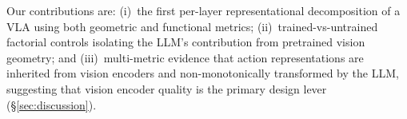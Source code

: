 Our contributions are: (i)~the first per-layer representational decomposition of a VLA using both geometric and functional metrics; (ii)~trained-vs-untrained factorial controls isolating the LLM's contribution from pretrained vision geometry; and (iii)~multi-metric evidence that action representations are inherited from vision encoders and non-monotonically transformed by the LLM, suggesting that vision encoder quality is the primary design lever (\S\ref{sec:discussion}).
